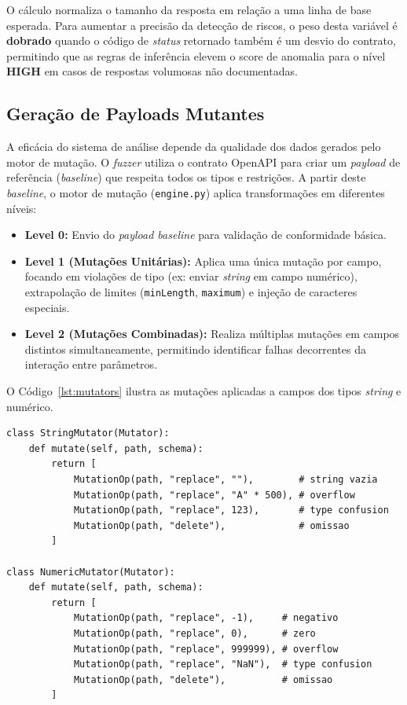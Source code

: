 O cálculo normaliza o tamanho da resposta em relação a uma linha de base esperada. Para aumentar a precisão da detecção de riscos, o peso desta variável é \textbf{dobrado} quando o código de \textit{status} retornado também é um desvio do contrato, permitindo que as regras de inferência elevem o score de anomalia para o nível \textbf{HIGH} em casos de respostas volumosas não documentadas.

\subsection{Geração de Payloads Mutantes}

A eficácia do sistema de análise depende da qualidade dos dados gerados pelo motor de mutação. O \textit{fuzzer} utiliza o contrato OpenAPI para criar um \textit{payload} de referência (\textit{baseline}) que respeita todos os tipos e restrições. A partir deste \textit{baseline}, o motor de mutação (\texttt{engine.py}) aplica transformações em diferentes níveis:

\begin{itemize}
    \item \textbf{Level 0:} Envio do \textit{payload baseline} para validação de conformidade básica.
    \item \textbf{Level 1 (Mutações Unitárias):} Aplica uma única mutação por campo, focando em violações de tipo (ex: enviar \textit{string} em campo numérico), extrapolação de limites (\texttt{minLength}, \texttt{maximum}) e injeção de caracteres especiais.
    \item \textbf{Level 2 (Mutações Combinadas):} Realiza múltiplas mutações em campos distintos simultaneamente, permitindo identificar falhas decorrentes da interação entre parâmetros.
\end{itemize}

O Código~\ref{lst:mutators} ilustra as mutações aplicadas a campos dos tipos \textit{string} e numérico.

\begin{lstlisting}[caption=Exemplos de mutadores (\texttt{string.py} e \texttt{numeric.py}), label=lst:mutators]
class StringMutator(Mutator):
    def mutate(self, path, schema):
        return [
            MutationOp(path, "replace", ""),        # string vazia
            MutationOp(path, "replace", "A" * 500), # overflow
            MutationOp(path, "replace", 123),       # type confusion
            MutationOp(path, "delete"),             # omissao
        ]

class NumericMutator(Mutator):
    def mutate(self, path, schema):
        return [
            MutationOp(path, "replace", -1),     # negativo
            MutationOp(path, "replace", 0),      # zero
            MutationOp(path, "replace", 999999), # overflow
            MutationOp(path, "replace", "NaN"),  # type confusion
            MutationOp(path, "delete"),          # omissao
        ]
\end{lstlisting}

